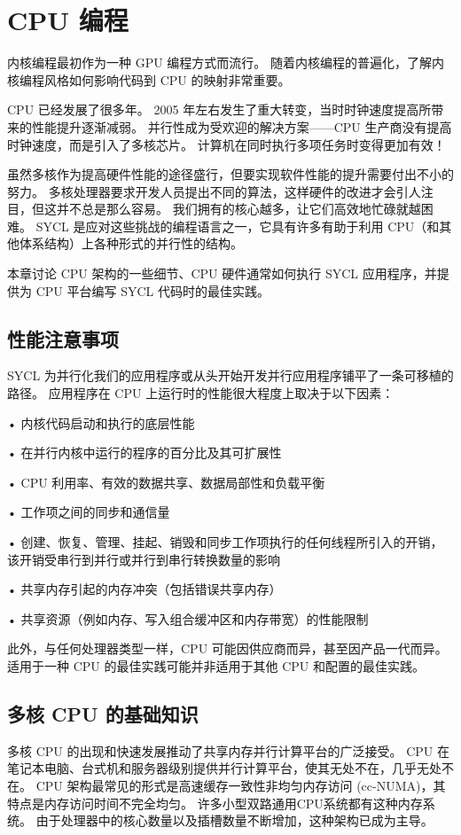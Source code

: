 \section{CPU 编程}
内核编程最初作为一种 GPU 编程方式而流行。 随着内核编程的普遍化，了解内核编程风格如何影响代码到 CPU 的映射非常重要。

CPU 已经发展了很多年。 2005 年左右发生了重大转变，当时时钟速度提高所带来的性能提升逐渐减弱。 并行性成为受欢迎的解决方案——CPU 生产商没有提高时钟速度，而是引入了多核芯片。 计算机在同时执行多项任务时变得更加有效！

虽然多核作为提高硬件性能的途径盛行，但要实现软件性能的提升需要付出不小的努力。 多核处理器要求开发人员提出不同的算法，这样硬件的改进才会引人注目，但这并不总是那么容易。 我们拥有的核心越多，让它们高效地忙碌就越困难。 SYCL 是应对这些挑战的编程语言之一，它具有许多有助于利用 CPU（和其他体系结构）上各种形式的并行性的结构。

本章讨论 CPU 架构的一些细节、CPU 硬件通常如何执行 SYCL 应用程序，并提供为 CPU 平台编写 SYCL 代码时的最佳实践。

\subsection{性能注意事项}
SYCL 为并行化我们的应用程序或从头开始开发并行应用程序铺平了一条可移植的路径。 应用程序在 CPU 上运行时的性能很大程度上取决于以下因素：

• 内核代码启动和执行的底层性能

• 在并行内核中运行的程序的百分比及其可扩展性

• CPU 利用率、有效的数据共享、数据局部性和负载平衡

• 工作项之间的同步和通信量

• 创建、恢复、管理、挂起、销毁和同步工作项执行的任何线程所引入的开销，该开销受串行到并行或并行到串行转换数量的影响

• 共享内存引起的内存冲突（包括错误共享内存）

• 共享资源（例如内存、写入组合缓冲区和内存带宽）的性能限制

此外，与任何处理器类型一样，CPU 可能因供应商而异，甚至因产品一代而异。 适用于一种 CPU 的最佳实践可能并非适用于其他 CPU 和配置的最佳实践。

\subsection{多核 CPU 的基础知识}
多核 CPU 的出现和快速发展推动了共享内存并行计算平台的广泛接受。 CPU 在笔记本电脑、台式机和服务器级别提供并行计算平台，使其无处不在，几乎无处不在。 CPU 架构最常见的形式是高速缓存一致性非均匀内存访问 (cc-NUMA)，其特点是内存访问时间不完全均匀。 许多小型双路通用CPU系统都有这种内存系统。 由于处理器中的核心数量以及插槽数量不断增加，这种架构已成为主导。

